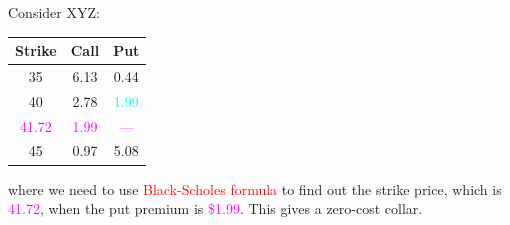\begin{frame}[fragile,t]
	\begin{myexample}
		Consider XYZ:
		\begin{center}
			\renewcommand{\arraystretch}{1.2}
			\begin{tabular}{ccc}
				\hline
				Strike                     & Call                      & Put                      \\
				\hline
				35                         & 6.13                      & 0.44                     \\
				40                         & 2.78                      & \textcolor{cyan}{1.99}   \\
				\textcolor{magenta}{41.72} & \textcolor{magenta}{1.99} & \textcolor{magenta}{---} \\
				45                         & 0.97                      & 5.08                     \\
			\end{tabular}
		\end{center}
		where we need to use \textcolor{red}{Black-Scholes formula} to find out the strike price, which is \textcolor{magenta}{41.72},
		when the put premium is \textcolor{magenta}{\$1.99}.
		This gives a zero-cost collar.
	\end{myexample}
\end{frame}
